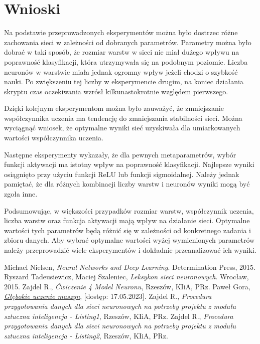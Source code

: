 \documentclass{article}
\begin{document}
\newpage
\section{Wnioski}
Na podstawie przeprowadzonych eksperymentów można było dostrzec różne zachowania sieci w zależności od dobranych parametrów.
Parametry można było dobrać w taki sposób, że rozmiar warstw w sieci nie miał dużego wpływu na poprawność klasyfikacji, która utrzymywała się na podobnym poziomie.
Liczba neuronów w warstwie miała jednak ogromny wpływ jeżeli chodzi o szybkość nauki. Po zwiększeniu tej liczby w eksperymencie drugim, na koniec działania skryptu czas oczekiwania wzrósł kilkunastokrotnie względem pierwszego.

Dzięki kolejnym eksperymentom można było zauważyć, że zmniejszanie współczynnika uczenia ma tendencję do zmniejszania stabilności sieci.
Można wyciągnąć wniosek, że optymalne wyniki sieć uzyskiwała dla umiarkowanych wartości współczynnika uczenia.

Następne eksperymenty wykazały, że dla pewnych metaparametrów, wybór funkcji aktywacji ma istotny wpływ na poprawność klasyfikacji.
Najlepsze wyniki osiągnięto przy użyciu funkcji ReLU lub funkcji sigmoidalnej.
Należy jednak pamiętać, że dla różnych kombinacji liczby warstw i neuronów wyniki mogą być zgoła inne.

Podsumowując, w większości przypadków rozmiar warstw, współczynnik uczenia, liczba warstw oraz funkcja aktywacji mają wpływ na działanie sieci.
Optymalne wartości tych parametrów będą różnić się w zależności od konkretnego zadania i zbioru danych.
Aby wybrać optymalne wartości wyżej wymienionych parametrów należy przeprowadzić wiele eksperymentów i dokładnie przeanalizować ich wyniki.

\newpage
\begin{thebibliography}{9}
    Michael Nielsen,
    \emph{Neural Networks and Deep Learning}.
    Determination Press,
    2015.
    Ryszard Tadeusiewicz, Maciej Szaleniec,
    \emph{Leksykon sieci neuronowych}.
    Wrocław,
    2015.
    Zajdel R.,
    \emph{Ćwiczenie 4 Model Neuronu},
    Rzeszów,
    KIiA, PRz.
    Paweł Gora,
    \href{https://www.deltami.edu.pl/temat/informatyka/sztuczna_inteligencja/2017/12/28/Glebokie_uczenie_maszyn/}{\emph{Głębokie uczenie maszyn}},
    [dostęp: 17.05.2023].
    Zajdel R.,
    \emph{Procedura przygotowania danych dla sieci neuronowych na potrzeby projektu z modułu sztuczna inteligencja - Listing1},
    Rzeszów,
    KIiA, PRz.
    Zajdel R.,
    \emph{Procedura przygotowania danych dla sieci neuronowych na potrzeby projektu z modułu sztuczna inteligencja - Listing2},
    Rzeszów,
    KIiA, PRz.
\end{thebibliography}
\end{document}
